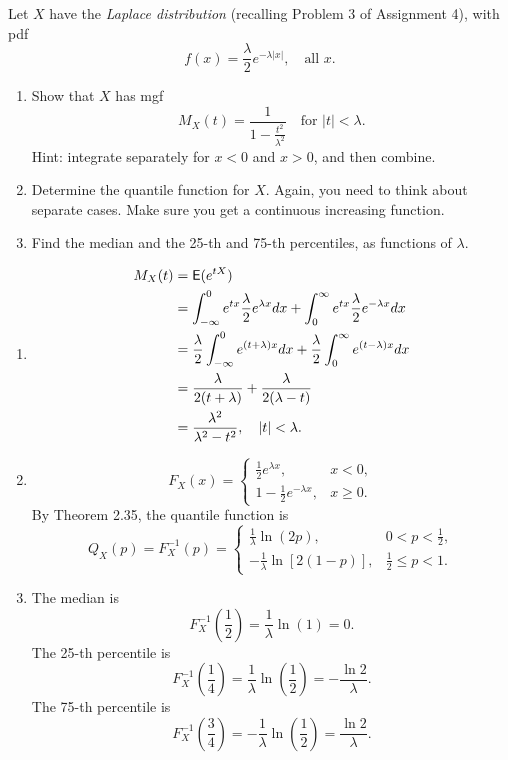 \documentclass[12pt]{article}
\newcommand{\E}{{\sf E}}
\newenvironment{problem}[2][Problem]{\begin{trivlist}
\item[\hskip \labelsep {\bfseries #1}\hskip \labelsep {\bfseries #2.}]}
{\end{trivlist}}
\begin{document}
\begin{problem}{3}
  Let $X$ have the \textit{Laplace distribution} 
  (recalling Problem 3 of Assignment 4), with pdf
  \[
    f(x) = \frac{\lambda}{2} e^{-\lambda|x|}, \quad \text{all } x.
  \]
  \begin{enumerate}
    \item Show that $X$ has mgf 
    \[
      M_X (t) = \frac{1}{1-\frac{t^2}{\lambda^2}} 
      \quad \text{for } |t| < \lambda.
    \] 
    Hint: integrate separately for $x < 0$ and $x > 0$, and then combine.
    \item Determine the quantile function for $X$. 
    Again, you need to think about separate cases. 
    Make sure you get a continuous increasing function.
    \item Find the median and the 25-th and 75-th percentiles, 
    as functions of $\lambda$.
  \end{enumerate}
  
  \begin{enumerate}
    \item \[
      \begin{aligned}
        M_X(t) &= \E(e^{tX}) \\
        &= \int_{-\infty}^0 e^{tx} \frac{\lambda}{2} e^{\lambda x} dx 
        + \int_0^\infty e^{tx} \frac{\lambda}{2} e^{-\lambda x} dx \\
        &= \frac{\lambda}{2} \int_{-\infty}^0 e^{(t+\lambda)x} dx 
        + \frac{\lambda}{2} \int_0^\infty e^{(t-\lambda)x} dx \\
        &= \frac{\lambda}{2(t+\lambda)} + \frac{\lambda}{2(\lambda - t)} \\
        &= \frac{\lambda^2}{\lambda^2 - t^2}, \quad |t| < \lambda.
      \end{aligned}
    \]
    \item \[
      F_X(x) = \begin{cases}
        \frac{1}{2} e^{\lambda x}, & x < 0, \\
        1 - \frac{1}{2} e^{-\lambda x}, & x \geq 0.
      \end{cases}
    \]
    By Theorem 2.35, the quantile function is
    \[
      Q_X(p) = F_X^{-1}(p) = \begin{cases}
        \frac{1}{\lambda} \ln(2p), & 0 < p < \frac{1}{2}, \\
        -\frac{1}{\lambda} \ln[2(1-p)], & \frac{1}{2} \leq p < 1.
      \end{cases} 
    \]
    \item The median is
    \[
      F_X^{-1}\left(\frac{1}{2}\right) = \frac{1}{\lambda} \ln(1) = 0.
    \]
    The 25-th percentile is
    \[
      F_X^{-1}\left(\frac{1}{4}\right) 
      = \frac{1}{\lambda} \ln\left(\frac{1}{2}\right) 
      = -\frac{\ln 2}{\lambda}.
    \]
    The 75-th percentile is
    \[
      F_X^{-1}\left(\frac{3}{4}\right) 
      = -\frac{1}{\lambda} \ln\left(\frac{1}{2}\right) 
      = \frac{\ln 2}{\lambda}.
    \]
  \end{enumerate}

\end{problem}
\end{document}
